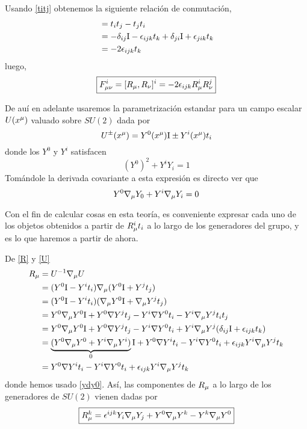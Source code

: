 Usando \eqref{titj} obtenemos la siguiente relación de conmutación,
\begin{align}
  [t_i,t_j]&=t_it_j-t_jt_i\\
  &=-\d_{ij}\id -\epsilon_{ijk}t_k+\d_{ji}\id +\epsilon_{jik}t_k\\
  &=-2\epsilon_{ijk}t_k\label{[titj]}
\end{align}
luego,
\begin{equation}
 \boxed{F_{\mu\nu }^{i}=[R_\mu ,R_\nu ]^{i}=-2\epsilon_{ijk}R_\mu ^{i}R_\nu ^j}
\end{equation}


De auí en adelante usaremos la parametrización estandar para un campo escalar $U(x^\mu )$ valuado sobre $SU(2)$ dada por
\begin{equation}\label{U}
  U^{\pm }(x^\mu )=Y^0(x^\mu )\mathrm{I} \pm Y^{i}(x^\mu )t_i
\end{equation}
donde los $Y^0$ y $Y^{i}$ satisfacen
\begin{equation}
  (Y^0)^2+Y^{i}Y_i=1
\end{equation}
Tomándole la derivada covariante a esta expresión es directo ver que
\begin{equation}\label{ydy0}
  Y^0\nabla_\mu Y_0+Y^{i}\nabla_\mu Y_i=0
\end{equation}

Con el fin de calcular cosas en esta teoría, es conveniente expresar cada uno de los objetos obtenidos a partir de $R_\mu^{i}t_i$ a lo largo de los generadores del grupo, y es lo que haremos a partir de ahora.

De \eqref{R} y \eqref{U}
\begin{align}
  R_\mu&=U^{-1}\nabla_\mu U\\
  &=(Y^0\mathrm{I}-Y^{i}t_i)\nabla_\mu (Y^0\mathrm{I} +Y^jt_j)\\
  &=(Y^0\mathrm{I}-Y^{i}t_i)(\nabla_\mu Y^0\mathrm{I} +\nabla_\mu Y^jt_j)\\
  &=Y^0\nabla_\mu Y^0\mathrm{I}+Y^0\nabla Y^jt_j-Y^{i}\nabla Y^0t_i-Y^{i}\nabla_\mu Y^jt_it_j\\
  &=Y^0\nabla_\mu Y^0\mathrm{I}+Y^0\nabla Y^jt_j-Y^{i}\nabla Y^0t_i+Y^{i}\nabla_\mu Y^j(\delta_{ij}\mathrm{I}+\epsilon_{ijk}t_k)\\
  &=\underbrace{(Y^0\nabla_\mu Y^0+Y^{i}\nabla_\mu Y^{i})}_0\mathrm{I} +Y^0\nabla Y^it_i-Y^{i}\nabla Y^0t_i+\epsilon_{ijk}Y^{i}\nabla_\mu Y^jt_k\\
  &=Y^0\nabla Y^it_i-Y^{i}\nabla Y^0t_i+\epsilon_{ijk}Y^{i}\nabla_\mu Y^jt_k
\end{align}
donde hemos usado \eqref{ydy0}. Así, las componentes de $R_\mu $ a lo largo de los generadores de $SU(2)$ vienen dadas por
\begin{equation}
  \boxed{R_\mu^k=\epsilon^{ijk}Y_{i}\nabla_\mu Y_j+Y^0\nabla_\mu  Y^k-Y^{k}\nabla_\mu  Y^0}
\end{equation}

